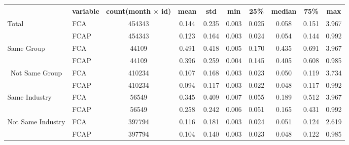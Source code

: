 \begin{tabular}{llcccccccc}
  \hline\hline
        & variable & count\tiny(month $ \times $ id) & mean  & std   & min   & 25\%  & median & 75\%  & max \\
        \hline
        \multirow{2}[0]{*}{Total} & FCA   & 454343 & 0.144 & 0.235 & 0.003 & 0.025 & 0.058 & 0.151 & 3.967 \\
        & FCAP  & 454343 & 0.123 & 0.164 & 0.003 & 0.024 & 0.054 & 0.144 & 0.992 \\
        \hline
        \multirow{2}[0]{*}{Same Group} & FCA   & 44109 & 0.491 & 0.418 & 0.005 & 0.170 & 0.435 & 0.691 & 3.967 \\
        & FCAP  & 44109 & 0.396 & 0.259 & 0.004 & 0.145 & 0.405 & 0.608 & 0.985 \\
        \hline
        \multicolumn{1}{c}{\multirow{2}[0]{*}{Not Same Group}} & FCA   & 410234 & 0.107 & 0.168 & 0.003 & 0.023 & 0.050 & 0.119 & 3.734 \\
        & FCAP  & 410234 & 0.094 & 0.117 & 0.003 & 0.022 & 0.048 & 0.117 & 0.992 \\
        \hline
        \multirow{2}[0]{*}{Same Industry} & FCA   & 56549 & 0.345 & 0.409 & 0.007 & 0.055 & 0.189 & 0.512 & 3.967 \\
        & FCAP  & 56549 & 0.258 & 0.242 & 0.006 & 0.051 & 0.165 & 0.431 & 0.992 \\
        \hline
        \multicolumn{1}{c}{\multirow{2}[0]{*}{Not Same Industry}} & FCA   & 397794 & 0.116 & 0.181 & 0.003 & 0.024 & 0.051 & 0.124 & 2.619 \\
        & FCAP  & 397794 & 0.104 & 0.140 & 0.003 & 0.023 & 0.048 & 0.122 & 0.985 \\
        
    
      
    
        \hline\hline
  \end{tabular}
